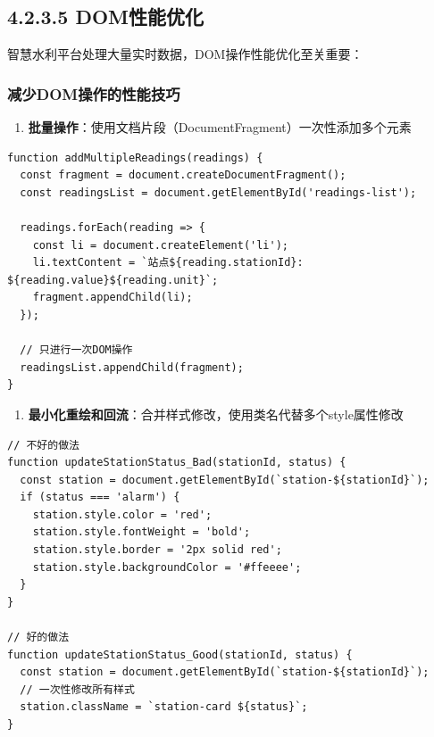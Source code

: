 \subsection{4.2.3.5 DOM性能优化}\label{domux6027ux80fdux4f18ux5316}

智慧水利平台处理大量实时数据，DOM操作性能优化至关重要：

\subsubsection{减少DOM操作的性能技巧}\label{ux51cfux5c11domux64cdux4f5cux7684ux6027ux80fdux6280ux5de7}

\begin{enumerate}
\def\labelenumi{\arabic{enumi}.}
\tightlist
\item
  \textbf{批量操作}：使用文档片段（DocumentFragment）一次性添加多个元素
\end{enumerate}

\begin{lstlisting}
function addMultipleReadings(readings) {
  const fragment = document.createDocumentFragment();
  const readingsList = document.getElementById('readings-list');
  
  readings.forEach(reading => {
    const li = document.createElement('li');
    li.textContent = `站点${reading.stationId}: ${reading.value}${reading.unit}`;
    fragment.appendChild(li);
  });
  
  // 只进行一次DOM操作
  readingsList.appendChild(fragment);
}
\end{lstlisting}

\begin{enumerate}
\def\labelenumi{\arabic{enumi}.}
\setcounter{enumi}{1}
\tightlist
\item
  \textbf{最小化重绘和回流}：合并样式修改，使用类名代替多个style属性修改
\end{enumerate}

\begin{lstlisting}
// 不好的做法
function updateStationStatus_Bad(stationId, status) {
  const station = document.getElementById(`station-${stationId}`);
  if (status === 'alarm') {
    station.style.color = 'red';
    station.style.fontWeight = 'bold';
    station.style.border = '2px solid red';
    station.style.backgroundColor = '#ffeeee';
  }
}

// 好的做法
function updateStationStatus_Good(stationId, status) {
  const station = document.getElementById(`station-${stationId}`);
  // 一次性修改所有样式
  station.className = `station-card ${status}`;
}
\end{lstlisting}

